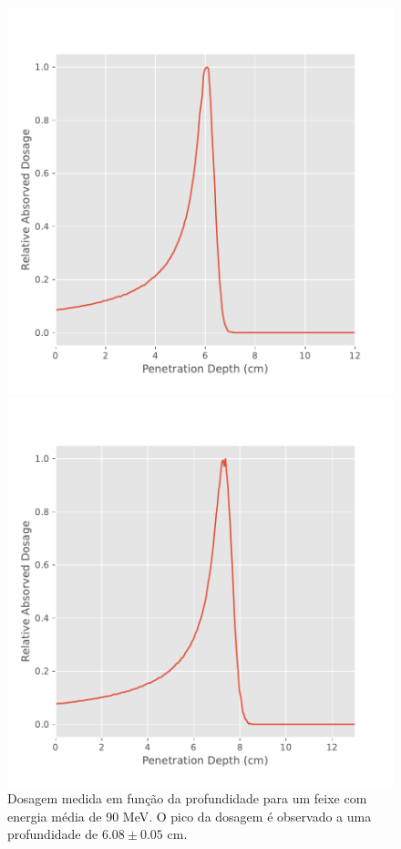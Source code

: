 \documentclass[a4paper, 12pt]{article} %
\begin{document}
	\begin{figure}[H]
		\begin{minipage}[r]{.49\linewidth}
			\centering
			\includegraphics[width=\linewidth]{bragg_peak_90mev.pdf}
			\caption{Dosagem medida em função da profundidade para um feixe com energia média de 90 MeV. O pico da dosagem é observado a uma profundidade de $6.08 \pm 0.05$ cm.}
			\label{fig:bragg_peak90}
		\end{minipage}
		\hspace{.01\linewidth}
		\begin{minipage}[r]{.49\linewidth}
			\centering
			\includegraphics[width=\linewidth]{bragg_peak_100mev.pdf}

\end{minipage}
\end{figure}
\end{document}

